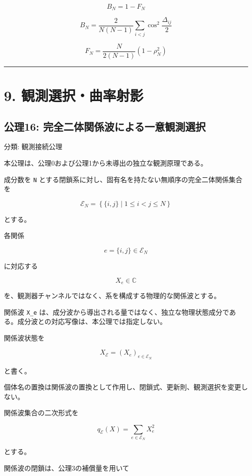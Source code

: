 \documentclass[
  a4paper,
]{ltjsarticle}
\begin{document}
\[
B_N=1-F_N
\]

\[
B_N=
\frac{2}{N(N-1)}
\sum_{i<j}\cos^2\frac{\Delta_{ij}}{2}
\]

\[
F_N=\frac{N}{2(N-1)}(1-\rho_N^2)
\]

\begin{center}\rule{0.5\linewidth}{0.5pt}\end{center}

\section{9.
観測選択・曲率射影}\label{ux89b3ux6e2cux9078ux629eux66f2ux7387ux5c04ux5f71}

\subsection{公理16:
完全二体関係波による一意観測選択}\label{ux516cux740616-ux5b8cux5168ux4e8cux4f53ux95a2ux4fc2ux6ce2ux306bux3088ux308bux4e00ux610fux89b3ux6e2cux9078ux629e}

分類: 観測接続公理

本公理は、公理0および公理1から未導出の独立な観測原理である。

成分数を \texttt{N}
とする閉鎖系に対し、固有名を持たない無順序の完全二体関係集合を

\[
\mathcal E_N
=\left\{\{i,j\}\mid 1\le i<j\le N\right\}
\]

とする。

各関係

\[
e=\{i,j\}\in\mathcal E_N
\]

に対応する

\[
X_e\in\mathbb C
\]

を、観測器チャンネルではなく、系を構成する物理的な関係波とする。

関係波 \texttt{X\_e}
は、成分波から導出される量ではなく、独立な物理状態成分である。成分波との対応写像は、本公理では指定しない。

関係波状態を

\[
X_{\mathcal E}
=\left(X_e\right)_{e\in\mathcal E_N}
\]

と書く。

個体名の置換は関係波の置換として作用し、閉鎖式、更新則、観測選択を変更しない。

関係波集合の二次形式を

\[
q_{\mathcal E}(X)
=\sum_{e\in\mathcal E_N}X_e^2
\]

とする。

関係波の閉鎖は、公理3の補償量を用いて
\end{document}
